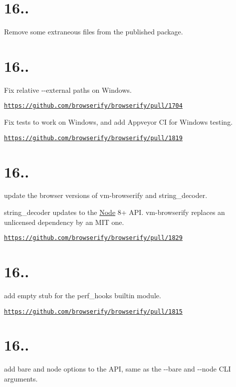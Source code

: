 \section*{16..}

Remove some extraneous files from the published package.

\section*{16..}

Fix relative {\ttfamily -\/-\/external} paths on Windows.

\href{https://github.com/browserify/browserify/pull/1704}{\tt https\+://github.\+com/browserify/browserify/pull/1704}

Fix tests to work on Windows, and add Appveyor CI for Windows testing.

\href{https://github.com/browserify/browserify/pull/1819}{\tt https\+://github.\+com/browserify/browserify/pull/1819}

\section*{16..}

update the browser versions of {\ttfamily vm-\/browserify} and {\ttfamily string\+\_\+decoder}.

{\ttfamily string\+\_\+decoder} updates to the \mbox{\hyperlink{classNode}{Node}} 8+ A\+PI. {\ttfamily vm-\/browserify} replaces an unlicensed dependency by an M\+IT one.

\href{https://github.com/browserify/browserify/pull/1829}{\tt https\+://github.\+com/browserify/browserify/pull/1829}

\section*{16..}

add empty stub for the {\ttfamily perf\+\_\+hooks} builtin module.

\href{https://github.com/browserify/browserify/pull/1815}{\tt https\+://github.\+com/browserify/browserify/pull/1815}

\section*{16..}

add {\ttfamily bare} and {\ttfamily node} options to the A\+PI, same as the {\ttfamily -\/-\/bare} and {\ttfamily -\/-\/node} C\+LI arguments.

